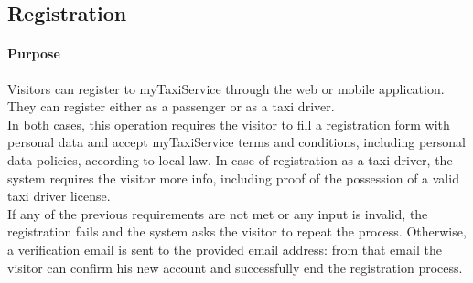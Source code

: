 \subsection{Registration}
\paragraph{Purpose}
Visitors can register to myTaxiService through the web or mobile application. They can register either as a passenger or as a taxi driver.\\
In both cases, this operation requires the visitor to fill a registration form with personal data and accept myTaxiService terms and conditions, including personal data policies, according to local law. In case of registration as a taxi driver, the system requires the visitor more info, including proof of the possession of a valid taxi driver license.\\
If any of the previous requirements are not met or any input is invalid, the registration fails and the system asks the visitor to repeat the process. Otherwise, a verification email is sent to the provided email address: from that email the visitor can confirm his new account and successfully end the registration process.

